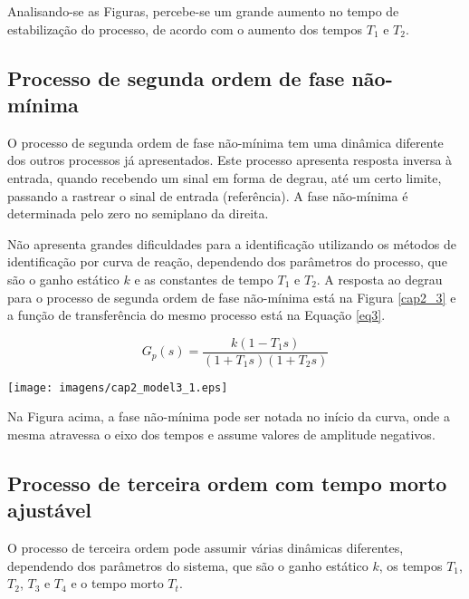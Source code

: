     Analisando-se as Figuras, percebe-se um grande aumento no tempo de estabilização
    do processo, de acordo com o aumento dos tempos $T_1$ e $T_2$.

\subsection{Processo de segunda ordem de fase não-mínima}

    O processo de segunda ordem de fase não-mínima tem uma dinâmica diferente dos
    outros processos já apresentados. Este processo apresenta resposta inversa à
    entrada, quando recebendo um sinal em forma de degrau, até um certo limite,
    passando a rastrear o sinal de entrada (referência). A fase não-mínima é
    determinada pelo zero no semiplano da direita.
    
    Não apresenta grandes dificuldades para a identificação utilizando os métodos
    de identificação por curva de reação, dependendo dos parâmetros do processo,
    que são o ganho estático $k$ e as constantes de tempo $T_1$ e $T_2$. A resposta
    ao degrau para o processo de segunda ordem de fase não-mínima está na Figura
    \ref{cap2_3} e a função de transferência do mesmo processo está na Equação
    \ref{eq3}.

    \begin{equation}
        \label{eq3}
        G_p(s) = \frac{k(1-T_1 s)}{(1+T_1 s)(1+T_2 s)}
    \end{equation}

    \begin{center}
        \texttt{[image: imagens/cap2\_model3\_1.eps]}
        \label{cap2_3}
    \end{center}

    Na Figura acima, a fase não-mínima pode ser notada no início da curva, onde
    a mesma atravessa o eixo dos tempos e assume valores de amplitude negativos.

\subsection{Processo de terceira ordem com tempo morto ajustável}
    
    O processo de terceira ordem pode assumir várias dinâmicas diferentes, dependendo
    dos parâmetros do sistema, que são o ganho estático $k$, os tempos $T_1$, $T_2$,
    $T_3$ e $T_4$ e o tempo morto $T_t$.
    
